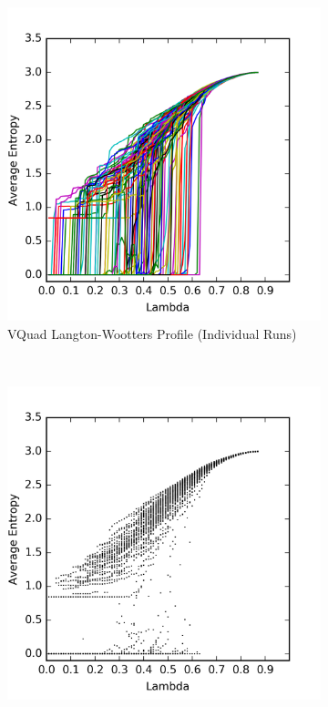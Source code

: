 \documentclass[a4paper,11pt]{article}
\begin{document}
\begin{figure}[htp]
\centering
\begin{subfigure}[t]{0.65\textwidth}
  \includegraphics[width=\textwidth]{ch6_figs/vor_entropy}
  \caption{VQuad Langton-Wootters Profile (Individual Runs)}
  \label{fig:vor_lw_run}
\end{subfigure}
~
\begin{subfigure}[t]{0.65\textwidth}
  \centering
  \includegraphics[width=\textwidth]{ch6_figs/vor_entropy_scatter}

\end{subfigure}
\end{figure}
\end{document}
